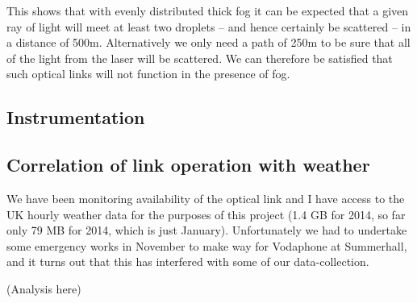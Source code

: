 This shows that with evenly distributed thick fog it can be expected
that a given ray of light will meet at least two droplets -- and hence
certainly be scattered -- in a distance of 500m. Alternatively we only
need a path of 250m to be sure that all of the light from the laser
will be scattered. We can therefore be satisfied that such optical
links will not function in the presence of fog.

\clearpage
\subsection{Instrumentation}

\subsection{Correlation of link operation with weather}
\label{sec:weather}

We have been monitoring availability of the optical link and I have
access to the UK hourly weather data for the purposes of this project
(1.4 GB for 2014, so far only 79 MB for 2014, which is just
January). Unfortunately we had to undertake some emergency works in
November to make way for Vodaphone at Summerhall, and it turns out
that this has interfered with some of our data-collection.

(Analysis here)

